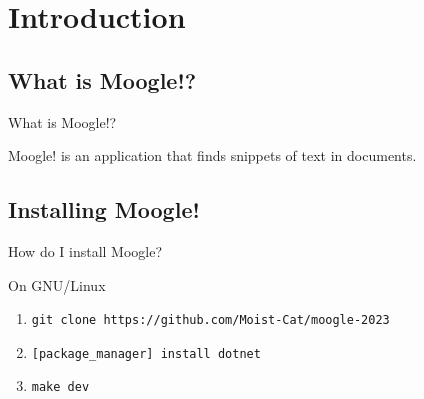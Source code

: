 \section{Introduction}

\subsection{What is Moogle!?}

\begin{frame}{What is  Moogle!?}
\begin{center}
    Moogle! is an application that finds snippets of text in documents.
\end{center}
\end{frame}


\subsection{Installing Moogle!}

\begin{frame}{How do I install Moogle?}

\begin{block}{On GNU/Linux}
    \begin{enumerate}
        \item{\texttt{git clone https://github.com/Moist-Cat/moogle-2023}}
        \item{\texttt{[package\_manager] install dotnet}}
        \item{\texttt{make dev}}
    \end{enumerate}
\end{block}

\end{frame}
